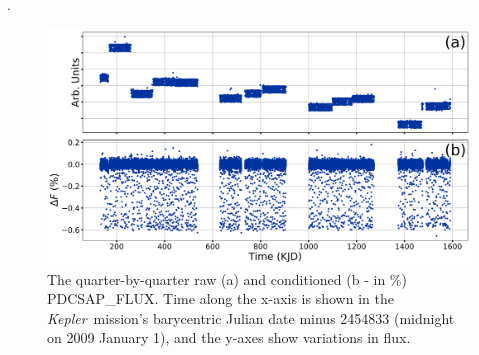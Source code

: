 \documentclass[manuscript]{aastex62}
\newcommand{\kepler}{{\it Kepler}}
\begin{document}


\acknowledgments



.




\begin{figure}
\includegraphics[width=\textwidth]{raw-conditioned-data_Analysis_of_Kepler76b.png}
\caption{The quarter-by-quarter raw (a) and conditioned (b - in \%) PDCSAP\_FLUX. Time along the x-axis is shown in the \kepler\ mission's barycentric Julian date minus 2454833 (midnight on 2009 January 1), and the y-axes show variations in flux.}
\label{fig:raw-conditioned-data_Analysis_of_Kepler76b}
\end{figure}
\end{document}
